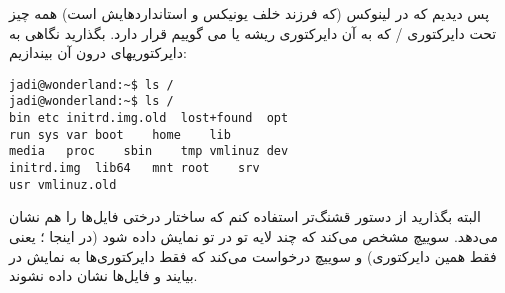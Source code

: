 پس دیدیم که در لینوکس (که فرزند خلف یونیکس و استانداردهایش است) همه چیز تحت دایرکتوری / که به آن دایرکتوری ریشه یا 
 می گوییم قرار دارد. بگذارید نگاهی به دایرکتوریهای درون آن بیندازیم:
\begin{frameng}
\begin{lstlisting}
jadi@wonderland:~$ ls / 
jadi@wonderland:~$ ls / 
bin	etc	initrd.img.old	lost+found	opt
run	sys	var	boot	home	lib
media	proc	sbin	tmp	vmlinuz	dev
initrd.img	lib64	mnt	root	srv
usr	vmlinuz.old
\end{lstlisting}
\end{frameng}
البته بگذارید از دستور قشنگ‌تر 
 استفاده کنم که ساختار درختی فایل‌ها را هم نشان می‌دهد. سوییچ
   مشخص می‌کند که چند لایه تو در تو نمایش داده شود (در اینجا
   ؛ یعنی فقط همین دایرکتوری) و سوییچ
   درخواست می‌کند که فقط دایرکتوری‌ها به نمایش در بیایند و فایل‌ها نشان داده نشوند.

